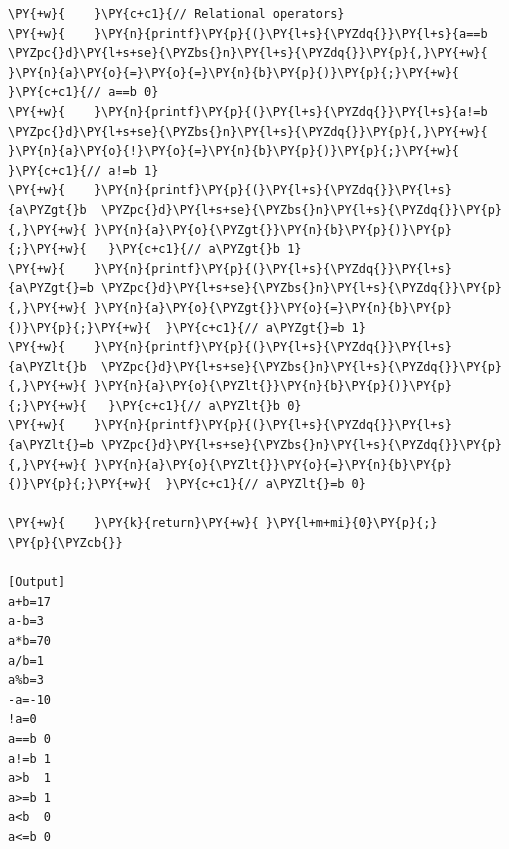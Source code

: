 \begin{Verbatim}[label=\makebox{\url{https://github.com/lucabaldini/cmepda/tree/master/slides/latex/snippets/operators.c}},commandchars=\\\{\}]
\PY{+w}{    }\PY{c+c1}{// Relational operators}
\PY{+w}{    }\PY{n}{printf}\PY{p}{(}\PY{l+s}{\PYZdq{}}\PY{l+s}{a==b \PYZpc{}d}\PY{l+s+se}{\PYZbs{}n}\PY{l+s}{\PYZdq{}}\PY{p}{,}\PY{+w}{ }\PY{n}{a}\PY{o}{=}\PY{o}{=}\PY{n}{b}\PY{p}{)}\PY{p}{;}\PY{+w}{  }\PY{c+c1}{// a==b 0}
\PY{+w}{    }\PY{n}{printf}\PY{p}{(}\PY{l+s}{\PYZdq{}}\PY{l+s}{a!=b \PYZpc{}d}\PY{l+s+se}{\PYZbs{}n}\PY{l+s}{\PYZdq{}}\PY{p}{,}\PY{+w}{ }\PY{n}{a}\PY{o}{!}\PY{o}{=}\PY{n}{b}\PY{p}{)}\PY{p}{;}\PY{+w}{  }\PY{c+c1}{// a!=b 1}
\PY{+w}{    }\PY{n}{printf}\PY{p}{(}\PY{l+s}{\PYZdq{}}\PY{l+s}{a\PYZgt{}b  \PYZpc{}d}\PY{l+s+se}{\PYZbs{}n}\PY{l+s}{\PYZdq{}}\PY{p}{,}\PY{+w}{ }\PY{n}{a}\PY{o}{\PYZgt{}}\PY{n}{b}\PY{p}{)}\PY{p}{;}\PY{+w}{   }\PY{c+c1}{// a\PYZgt{}b 1}
\PY{+w}{    }\PY{n}{printf}\PY{p}{(}\PY{l+s}{\PYZdq{}}\PY{l+s}{a\PYZgt{}=b \PYZpc{}d}\PY{l+s+se}{\PYZbs{}n}\PY{l+s}{\PYZdq{}}\PY{p}{,}\PY{+w}{ }\PY{n}{a}\PY{o}{\PYZgt{}}\PY{o}{=}\PY{n}{b}\PY{p}{)}\PY{p}{;}\PY{+w}{  }\PY{c+c1}{// a\PYZgt{}=b 1}
\PY{+w}{    }\PY{n}{printf}\PY{p}{(}\PY{l+s}{\PYZdq{}}\PY{l+s}{a\PYZlt{}b  \PYZpc{}d}\PY{l+s+se}{\PYZbs{}n}\PY{l+s}{\PYZdq{}}\PY{p}{,}\PY{+w}{ }\PY{n}{a}\PY{o}{\PYZlt{}}\PY{n}{b}\PY{p}{)}\PY{p}{;}\PY{+w}{   }\PY{c+c1}{// a\PYZlt{}b 0}
\PY{+w}{    }\PY{n}{printf}\PY{p}{(}\PY{l+s}{\PYZdq{}}\PY{l+s}{a\PYZlt{}=b \PYZpc{}d}\PY{l+s+se}{\PYZbs{}n}\PY{l+s}{\PYZdq{}}\PY{p}{,}\PY{+w}{ }\PY{n}{a}\PY{o}{\PYZlt{}}\PY{o}{=}\PY{n}{b}\PY{p}{)}\PY{p}{;}\PY{+w}{  }\PY{c+c1}{// a\PYZlt{}=b 0}

\PY{+w}{    }\PY{k}{return}\PY{+w}{ }\PY{l+m+mi}{0}\PY{p}{;}
\PY{p}{\PYZcb{}}

[Output]
a+b=17
a-b=3
a*b=70
a/b=1
a%b=3
-a=-10
!a=0
a==b 0
a!=b 1
a>b  1
a>=b 1
a<b  0
a<=b 0
\end{Verbatim}